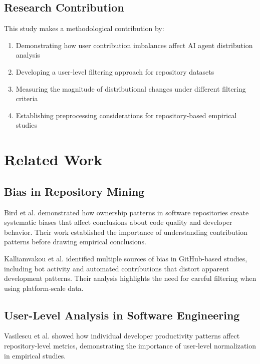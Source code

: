\documentclass[conference]{IEEEtran}
\begin{document}
\subsection{Research Contribution}

This study makes a methodological contribution by:

\begin{enumerate}
    \item Demonstrating how user contribution imbalances affect AI agent distribution analysis
    \item Developing a user-level filtering approach for repository datasets
    \item Measuring the magnitude of distributional changes under different filtering criteria
    \item Establishing preprocessing considerations for repository-based empirical studies
\end{enumerate}

\section{Related Work}

\subsection{Bias in Repository Mining}

Bird et al. \cite{bird2011dont} demonstrated how ownership patterns in software repositories create systematic biases that affect conclusions about code quality and developer behavior. Their work established the importance of understanding contribution patterns before drawing empirical conclusions.

Kalliamvakou et al. \cite{kalliamvakou2014promises} identified multiple sources of bias in GitHub-based studies, including bot activity and automated contributions that distort apparent development patterns. Their analysis highlights the need for careful filtering when using platform-scale data.

\subsection{User-Level Analysis in Software Engineering}

Vasilescu et al. \cite{vasilescu2015quality} showed how individual developer productivity patterns affect repository-level metrics, demonstrating the importance of user-level normalization in empirical studies.
\end{document}
